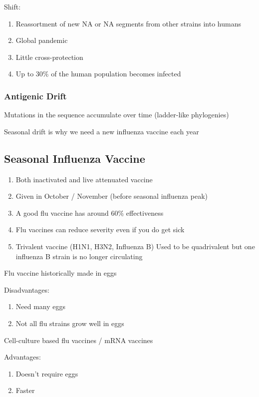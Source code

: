 \documentclass{notes}
\begin{document}
Shift:

\begin{enumerate}
    \item Reassortment of new NA or NA segments from other strains into humans
    \item Global pandemic
    \item Little cross-protection
    \item Up to 30\% of the human population becomes infected
\end{enumerate}

\subsubsection{Antigenic Drift}

Mutations in the sequence accumulate over time (ladder-like phylogenies)

Seasonal drift is why we need a new influenza vaccine each year

\subsection{Seasonal Influenza Vaccine}

\begin{enumerate}
    \item Both inactivated and live attenuated vaccine
    \item Given in October / November (before seasonal influenza peak)
    \item A good flu vaccine has around 60\% effectiveness
    \item Flu vaccines can reduce severity even if you do get sick
    \item Trivalent vaccine (H1N1, H3N2, Influenza B)
    \subitem Used to be quadrivalent but one influenza B strain is no longer circulating
\end{enumerate}

Flu vaccine historically made in eggs

Disadvantages:

\begin{enumerate}
    \item Need many eggs
    \item Not all flu strains grow well in eggs
\end{enumerate}

Cell-culture based flu vaccines / mRNA vaccines

Advantages:

\begin{enumerate}
    \item Doesn't require eggs
    \item Faster
\end{enumerate}
\end{document}

